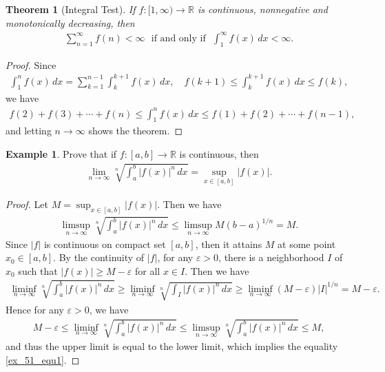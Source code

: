 \documentclass[10pt]{book}
\newtheorem{theorem}{Theorem}[chapter]
\theoremstyle{definition}
\newtheorem{example}{Example}[chapter]
\numberwithin{equation}{chapter}
\begin{document}
\begin{theorem}[Integral Test]
If $f: [1,\infty) \to \mathbb{R}$ is continuous, nonnegative and monotonically decreasing, then
\begin{align*}
    \sum^\infty_{n=1} f(n) < \infty \,\,\,\, \text{if and only if} \,\,\,\, \int^\infty_{1} f(x) \,dx < \infty.
\end{align*}
\end{theorem}
\begin{proof}
Since
\begin{align*}
    \int^n_1 f(x) \,dx = \sum^{n-1}_{k=1} \int^{k+1}_k f(x) \,dx, \quad f(k+1) \leq \int^{k+1}_k f(x) \,dx \leq f(k),
\end{align*}
we have 
\begin{align*}
    f(2) + f(3) + \cdots + f(n) \leq \int^n_1 f(x) \,dx \leq f(1) + f(2) + \cdots + f(n - 1),
\end{align*}
and letting $n \to \infty$ shows the theorem.
\end{proof}

\medskip

\begin{example}
Prove that if $f: [a,b] \to \mathbb{R}$ is continuous, then
\begin{align}\label{ex_51_equ1}
    \lim_{n\to\infty} \sqrt[n]{\int^b_a \left|f(x)\right|^n \,dx} = \sup_{x \in [a,b]} \left|f(x)\right|.
\end{align}
\end{example}
\begin{proof}
Let $M = \sup_{x \in [a,b]} \left|f(x)\right|$. Then we have
\begin{align*}
    \limsup_{n\to\infty} \sqrt[n]{\int^b_a \left|f(x)\right|^n \,dx} \leq \limsup_{n\to\infty} M(b-a)^{1/n}  = M.
\end{align*}
Since $\left|f\right|$ is continuous on compact set $[a,b]$, then it attains $M$ at some point $x_0 \in [a,b]$. By the continuity of $\left|f\right|$, for any $\varepsilon > 0$, there is a neighborhood $I$ of $x_0$ such that $\left|f(x)\right| \geq M - \varepsilon$ for all $x \in I$. Then we have
\begin{align*}
    \liminf_{n\to\infty} \sqrt[n]{\int^b_a \left|f(x)\right|^n \,dx} \geq \liminf_{n\to\infty} \sqrt[n]{\int_I \left|f(x)\right|^n \,dx} \geq \liminf_{n\to\infty} (M - \varepsilon) \left|I\right|^{1/n} = M - \varepsilon.
\end{align*}
Hence for any $\varepsilon > 0$, we have
\begin{align*}
    M - \varepsilon \leq \liminf_{n\to\infty} \sqrt[n]{\int^b_a \left|f(x)\right|^n \,dx} \leq \limsup_{n\to\infty} \sqrt[n]{\int^b_a \left|f(x)\right|^n \,dx} \leq M,
\end{align*}
and thus the upper limit is equal to the lower limit, which implies the equality \eqref{ex_51_equ1}.
\end{proof}
\end{document}

